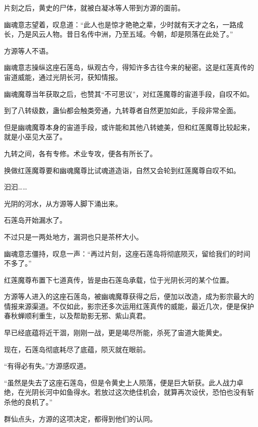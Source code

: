 
\begin{this_body}



片刻之后，黄史的尸体，就被白凝冰等人带到方源的面前。

幽魂意志望着，叹息道：“此人也是惊才艳艳之辈，少时就有天才之名，一路成长，乃是风云人物。昔日名传中洲，乃至五域。今朝，却是陨落在此处了。”

方源等人不语。

幽魂意志操纵这座石莲岛，纵观古今，得知许多古往今来的秘密。这是红莲真传的宙道威能，通过光阴长河，获知情报。

幽魂魔尊当年获取之后，也赞其“不可思议”，对红莲魔尊的宙道手段，自叹不如。

到了八转级数，蛊仙都会触类旁通，九转尊者自然更加如此，手段非常全面。

但是幽魂魔尊本身的宙道手段，或许能和其他八转媲美，但和红莲魔尊比较起来，就是小巫见大巫了。

九转之间，各有专修。术业专攻，便各有所长了。

换做红莲魔尊要和幽魂魔尊比试魂道造诣，自然又会轮到红莲魔尊自叹不如。

汩汩……

光阴的河水，从方源等人脚下涌出来。

石莲岛开始漏水了。

不过只是一两处地方，漏洞也只是茶杯大小。

幽魂意志僵持，叹息一声：“再过片刻，这座石莲岛将彻底陨灭，留给我们的时间不多了。”

红莲魔尊布置下七道真传，皆是由石莲岛承载，位于光阴长河的某个位置。

方源等人进入的这座石莲岛，被幽魂魔尊获得之后，便加以改造，成为影宗最大的情报来源渠道。不仅如此，影宗还多次运用红莲真传的威能，最近几次，便是保护春秋蝉顺利重生，以及帮助影无邪、紫山真君。

早已经底蕴将近干涸，刚刚一战，更是竭尽所能，杀死了宙道大能黄史。

现在，石莲岛彻底耗尽了底蕴，陨灭就在眼前。

“有得必有失。”方源感叹道。

“虽然是失去了这座石莲岛，但是令黄史上人陨落，便是巨大斩获。此人战力卓绝，在光阴长河中如鱼得水。若放过这次绝佳机会，就算再次设伏，恐怕也没有斩杀他的良机了。”

群仙点头，方源的这项决定，都得到他们的认同。


\end{this_body}
